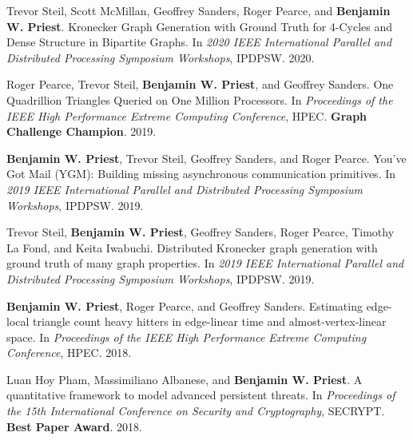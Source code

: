 \item Trevor Steil, Scott McMillan, Geoffrey Sanders, Roger Pearce, and \textbf{Benjamin W. Priest}.
	Kronecker Graph Generation with Ground Truth for 4-Cycles and Dense Structure in Bipartite Graphs.
	In \emph{2020 IEEE International Parallel and Distributed Processing Symposium Workshops}, 
	IPDPSW. 
	2020.

\item Roger Pearce, Trevor Steil, \textbf{Benjamin W. Priest}, and Geoffrey Sanders.
	One Quadrillion Triangles Queried on One Million Processors.
	In \emph{Proceedings of the IEEE High Performance Extreme Computing Conference}, 
	HPEC. 
	\textbf{Graph Challenge Champion}.
	2019.

\item \textbf{Benjamin W. Priest}, Trevor Steil, Geoffrey Sanders, and Roger Pearce.
	You've {G}ot {M}ail (YGM): Building missing asynchronous communication primitives.
	In \emph{2019 IEEE International Parallel and Distributed Processing Symposium Workshops}, 
	IPDPSW. 
	2019.

\item Trevor Steil, \textbf{Benjamin W. Priest}, Geoffrey Sanders, Roger Pearce, Timothy La Fond, and Keita Iwabuchi.
	Distributed Kronecker graph generation with ground truth of many graph properties.
	In \emph{2019 IEEE International Parallel and Distributed Processing Symposium Workshops}, 
	IPDPSW. 
	2019.

\item \textbf{Benjamin W. Priest}, Roger Pearce, and Geoffrey Sanders.
	Estimating edge-local triangle count heavy hitters in edge-linear time and almost-vertex-linear space.
	In \emph{Proceedings of the IEEE High Performance Extreme Computing Conference}, 
	HPEC. 
	2018.

\item Luan Hoy Pham, Massimiliano Albanese, and \textbf{Benjamin W. Priest}.
	A quantitative framework to model advanced persistent threats.
	In \emph{Proceedings of the 15th International Conference on Security and Cryptography}, 
	SECRYPT. 
	\textbf{Best Paper Award}.
	2018.
